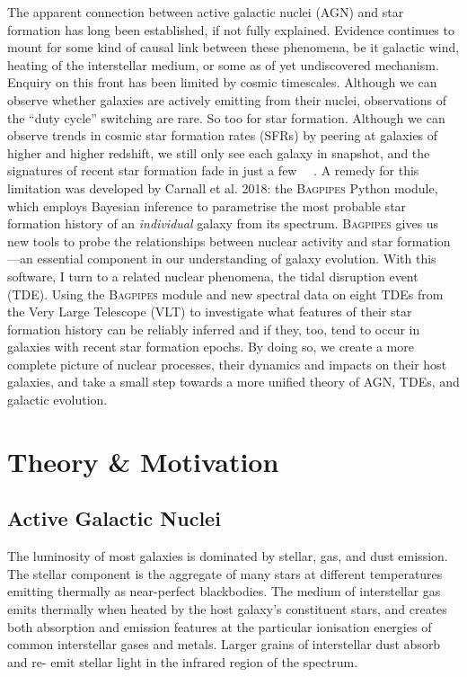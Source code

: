 \documentclass[a4paper,12pt]{article}
\begin{document}
The apparent connection between active galactic nuclei (AGN) and star formation
has long been established, if not fully explained. Evidence continues to mount
for some kind of causal link between these phenomena, be it galactic wind,
heating of the interstellar medium, or some as of yet undiscovered mechanism.
Enquiry on this front has been limited by cosmic timescales. Although we can
observe whether galaxies are actively emitting from their nuclei, observations
of the ``duty cycle'' switching are rare.\cite{Lawrence_1987} So too for star
formation. Although we can observe trends in cosmic star formation rates (SFRs)
by peering at galaxies of higher and higher redshift, we still only see each
galaxy in snapshot, and the signatures of recent star formation fade in just a
few \SI{}{\mega\year}. A remedy for this limitation was developed by Carnall et
al. 2018: the \textsc{Bagpipes} Python module, which employs Bayesian inference
to parametrise the most probable star formation history of an
\textit{individual} galaxy from its spectrum.\cite{Carnall_2018}
\textsc{Bagpipes} gives us new tools to probe the relationships between nuclear
activity and star formation---an essential component in our understanding of
galaxy evolution. With this software, I turn to a related nuclear phenomena,
the tidal disruption event (TDE). Using the \textsc{Bagpipes} module and new
spectral data on eight TDEs from the Very Large Telescope (VLT) to investigate
what features of their star formation history can be reliably inferred and if
they, too, tend to occur in galaxies with recent star formation epochs. By
doing so, we create a more complete picture of nuclear processes, their
dynamics and impacts on their host galaxies, and take a small step towards a
more unified theory of AGN, TDEs, and galactic evolution.

\section{Theory \& Motivation}\label{sec:theory_and_motivation}
\subsection{Active Galactic Nuclei}\label{sec:active_galactic_nuclei}

The luminosity of most galaxies is dominated by stellar, gas, and dust
emission. The stellar component is the aggregate of many stars at different
temperatures emitting thermally as near-perfect
blackbodies.\cite{Peterson_1997} The medium of interstellar gas emits thermally
when heated by the host galaxy's constituent stars, and creates both absorption
and emission features at the particular ionisation energies of common
interstellar gases and metals. Larger grains of interstellar dust absorb and re-
emit stellar light in the infrared region of the spectrum.\cite{Dyson_1997}
\end{document}
